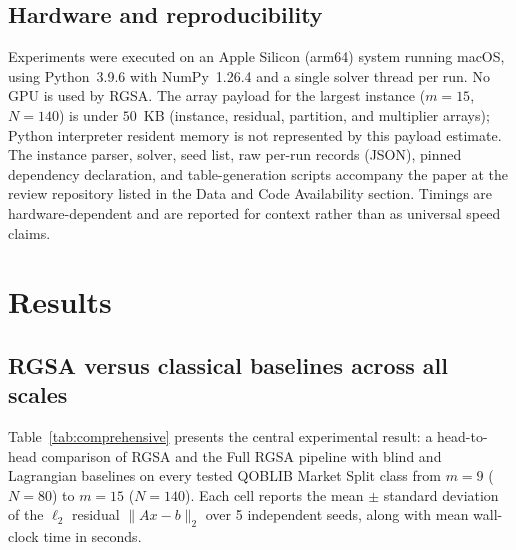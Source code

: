 \documentclass[11pt]{article}
\begin{document}
\subsection{Hardware and reproducibility}
Experiments were executed on an Apple Silicon (arm64) system running macOS, using Python~3.9.6 with NumPy~1.26.4 and a single solver thread per run. No GPU is used by RGSA. The array payload for the largest instance ($m{=}15$, $N{=}140$) is under $50$~KB (instance, residual, partition, and multiplier arrays); Python interpreter resident memory is not represented by this payload estimate. The instance parser, solver, seed list, raw per-run records (JSON), pinned dependency declaration, and table-generation scripts accompany the paper at the review repository listed in the Data and Code Availability section. Timings are hardware-dependent and are reported for context rather than as universal speed claims.

\section{Results}\label{sec:results}

\subsection{RGSA versus classical baselines across all scales}

Table~\ref{tab:comprehensive} presents the central experimental result: a head-to-head comparison of RGSA and the Full RGSA pipeline with blind and Lagrangian baselines on every tested QOBLIB Market Split class from $m=9$ ($N=80$) to $m=15$ ($N=140$). Each cell reports the mean $\pm$ standard deviation of the $\ell_2$ residual $\|Ax-b\|_2$ over 5 independent seeds, along with mean wall-clock time in seconds.


\end{document}
